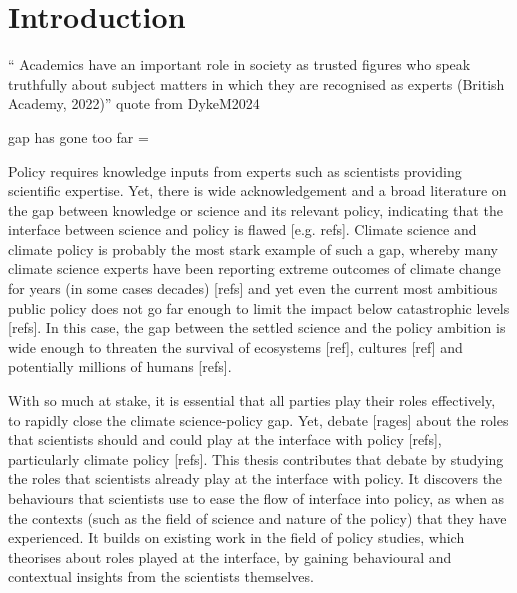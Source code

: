\chapter{Introduction}\label{ch:intro}


`` Academics have an important role in society as trusted figures who speak truthfully about subject matters in which they are recognised as experts (British Academy, 2022)'' quote from DykeM2024

gap has gone too far = \cite{Nau2009}



Policy requires knowledge inputs from experts such as scientists providing scientific expertise. Yet, there is wide acknowledgement and a broad literature on the gap between knowledge or science and its relevant policy, indicating that the interface between science and policy is flawed [e.g. refs]. Climate science and climate policy is probably the most stark example of such a gap, whereby many climate science experts have been reporting extreme outcomes of climate change for years (in some cases decades) [refs] and yet even the current most ambitious public policy does not go far enough to limit the impact below catastrophic levels [refs]. In this case, the gap between the settled science and the policy ambition is wide enough to threaten the survival of ecosystems [ref], cultures [ref] and potentially millions of humans [refs].

With so much at stake, it is essential that all parties play their roles effectively, to rapidly close the climate science-policy gap. Yet, debate [rages] about the roles that scientists should and could play at the interface with policy [refs], particularly climate policy [refs]. This thesis contributes that debate by studying the roles that scientists already play at the interface with policy. It discovers the behaviours that scientists use to ease the flow of interface into policy, as when as the contexts (such as the field of science and nature of the policy) that they have experienced. It builds on existing work in the field of policy studies, which theorises about roles played at the interface, by gaining behavioural and contextual insights from the scientists themselves.


